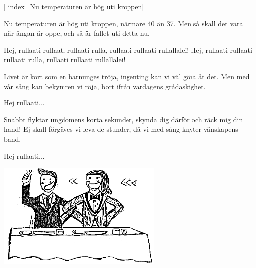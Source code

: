 [ 						
	index={Nu temperaturen är hög uti kroppen}]		
	
\beginverse*						
Nu temperaturen är hög uti kroppen, 
närmare 40 än 37.
 Men så skall det vara när ångan är oppe, 
och så är fallet uti detta nu. 
\endverse

\beginchorus				
Hej, rullaati rullaati rullaati rulla,
rullaati rullaati rullallalei! 
Hej, rullaati rullaati rullaati rulla,
rullaati rullaati rullallalei! 
\endchorus

\beginverse
Livet är kort som en barnunges tröja, 
ingenting kan vi väl göra åt det.
Men med vår sång kan bekymren vi röja, 
bort ifrån vardagens grådaskighet. 
\endverse	

\beginchorus
Hej rullaati...	
\endchorus

\beginverse
Snabbt flyktar ungdomens korta sekunder, 
skynda dig därför och räck mig din hand! 
Ej skall förgäves vi leva de stunder, 
då vi med sång knyter vänskapens band. 
\endverse	

\beginchorus
Hej rullaati...
\endchorus	
\endsong	

\begin{intersong}
	\begin{center}
		\includegraphics[width=0.6\textwidth]{../bilder/fardigabilder/CamillasFardigaBilder/Punschenkommer2.png} 
	\end{center}
\end{intersong}	